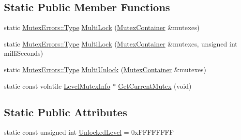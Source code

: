 \subsection*{Static Public Member Functions}
\begin{DoxyCompactItemize}
\item 
static \hyperlink{classLoki_1_1MutexErrors_acd0eb6065ca303083d2e0229d7bff590}{Mutex\+Errors\+::\+Type} \hyperlink{classLoki_1_1LevelMutexInfo_adde650eae1cad8b4723e68cdb9130283}{Multi\+Lock} (\hyperlink{classLoki_1_1LevelMutexInfo_a76a0315d91234f5066c75660a9f27a7f}{Mutex\+Container} \&mutexes)
\item 
static \hyperlink{classLoki_1_1MutexErrors_acd0eb6065ca303083d2e0229d7bff590}{Mutex\+Errors\+::\+Type} \hyperlink{classLoki_1_1LevelMutexInfo_aa76848d3aa8e6c66454bd5357f715583}{Multi\+Lock} (\hyperlink{classLoki_1_1LevelMutexInfo_a76a0315d91234f5066c75660a9f27a7f}{Mutex\+Container} \&mutexes, unsigned int milli\+Seconds)
\item 
static \hyperlink{classLoki_1_1MutexErrors_acd0eb6065ca303083d2e0229d7bff590}{Mutex\+Errors\+::\+Type} \hyperlink{classLoki_1_1LevelMutexInfo_a475d734ba0e756935462a5151ea98065}{Multi\+Unlock} (\hyperlink{classLoki_1_1LevelMutexInfo_a76a0315d91234f5066c75660a9f27a7f}{Mutex\+Container} \&mutexes)
\item 
static const volatile \hyperlink{classLoki_1_1LevelMutexInfo}{Level\+Mutex\+Info} $\ast$ \hyperlink{classLoki_1_1LevelMutexInfo_ab7fd94847721b118979b72121472d3e2}{Get\+Current\+Mutex} (void)
\end{DoxyCompactItemize}
\subsection*{Static Public Attributes}
\begin{DoxyCompactItemize}
\item 
static const unsigned int \hyperlink{classLoki_1_1LevelMutexInfo_a1f68bae408eb26856776cf02efed90bc}{Unlocked\+Level} = 0x\+F\+F\+F\+F\+F\+F\+F\+F
\end{DoxyCompactItemize}
